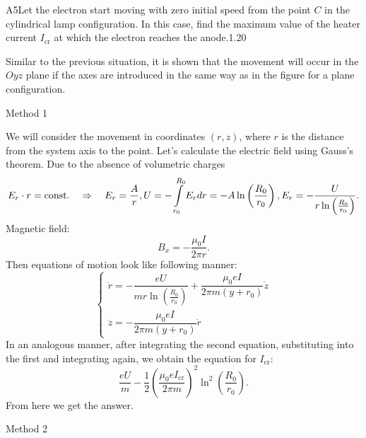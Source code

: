 \documentclass[11pt,a4paper]{article}
\begin{document}
\begin{solcard}{A5}{Let the electron start moving with zero initial speed from the point $C$ in the cylindrical lamp configuration. In this case, find the maximum value of the heater current $I_\text{cr}$ at which the electron reaches the anode.}{1.20}

Similar to the previous situation, it is shown that the movement will occur in the $Oyz$ plane if the axes are introduced in the same way as in the figure for a plane configuration.


Method 1


We will consider the movement in coordinates $(r, z)$, where $r$ is the distance from the system axis to the point. Let's calculate the electric field using Gauss's theorem. Due to the absence of volumetric charges $$E_r  \cdot r = \mbox{const}. \quad \Rightarrow \quad E_r= \frac{A}{r}, \\ U = -\int \limits_{r_0}^{R_0} E_r dr = -A \ln\left(\frac{R_0}{r_0}\right), \\ E_r = -\frac{U}{r \ln \left(\frac{R_0}{r_0}\right)}.$$ Magnetic field: $$B_x = -\frac{\mu_0 I}{2 \pi r}.$$ Then equations of motion look like following manner: $$\begin{cases} \ddot{r} = -\dfrac{e U}{m r \ln \left(\frac{R_0}{r_0}\right)} + \dfrac{\mu_0 e I}{2\pi m (y+r_0)}\dot{z} \\ \ddot{z} = -\dfrac{\mu_0 e I}{2 \pi m (y+r_0)}\dot{r} \end{cases}$$ In an analogous manner, after integrating the second equation, substituting into the first and integrating again, we obtain the equation for $I_\text{cr}$: $$\frac{e U}{m} -  \frac{1}{2} \left(\frac{\mu_0 e I_\text{cr}}{2 \pi m} \right)^2 \ln^2 \left(\frac{R_0}{r_0}\right).$$ From here we get the answer.


Method 2



\end{solcard}
\end{document}
